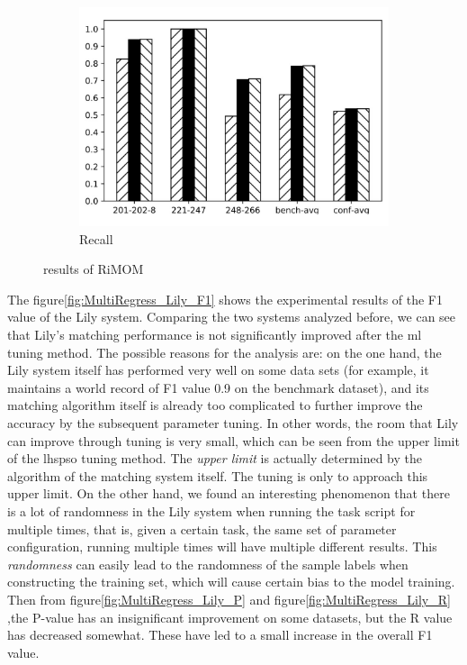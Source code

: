 \documentclass[twoside]{article}
\begin{document}
\begin{figure}[htb!]
\begin{subfigure}{0.3\textwidth}
\label{fig:MultiRegress_RiMOM_P}
\end{subfigure}
\begin{subfigure}{0.3\textwidth}
	\centering
\includegraphics[width=\textwidth]{data_figs/MulRegress_RiMOM_R.pdf}
\caption{Recall}
\label{fig:MultiRegress_RiMOM_R}
\end{subfigure}
\caption{results of RiMOM}
\end{figure}

The figure\ref{fig:MultiRegress_Lily_F1} shows the experimental results of the F1 value of the Lily system.
Comparing the two systems analyzed before, we can see that Lily's matching performance is not significantly improved after the ml tuning method.
The possible reasons for the analysis are: on the one hand, the Lily system itself has performed very well on some data sets (for example, it maintains a world record of F1 value 0.9 on the benchmark dataset), and its matching algorithm itself is already too complicated to further improve the accuracy by the subsequent parameter tuning.
In other words, the room that Lily can improve through tuning is very small, which can be seen from the upper limit of the lhspso tuning method.
The {\it upper limit} is actually determined by the algorithm of the matching system itself. The tuning is only to approach this upper limit. On the other hand, we found an interesting phenomenon that there is a lot of randomness in the Lily system when running the task script for multiple times, that is, given a certain task, the same set of parameter configuration, running multiple times will have multiple different results.
This {\it randomness} can easily lead to the randomness of the sample labels when constructing the training set, which will cause certain bias to the model training.
Then from figure\ref{fig:MultiRegress_Lily_P} and figure\ref{fig:MultiRegress_Lily_R} ,the P-value has an insignificant improvement on some datasets, but the R value has decreased somewhat. These have led to a small increase in the overall F1 value.
\end{document}
